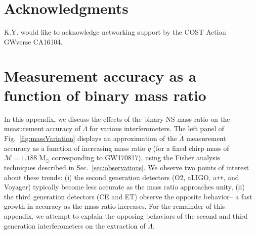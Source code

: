 \documentclass[prd,twocolumn,nofootinbib,superscriptaddress,amsmath,amssymb]{revtex4-1}
\begin{document}

\section*{Acknowledgments}\label{acknowledgments}
K.Y. would like to acknowledge networking support by the COST Action GWverse CA16104.


\appendix
\section{Measurement accuracy as a function of binary mass ratio}\label{app:measurement}
In this appendix, we discuss the effects of the binary NS mass ratio on the measurement accuracy of $\tilde\Lambda$ for various interferometers. 
The left panel of Fig.~\ref{fig:massVariation} displays an approximation of the $\tilde\Lambda$ measurement accuracy as a function of increasing mass ratio $q$ (for a fixed chirp mass of $\mathcal{M}=1.188 \text{ M}_{\odot}$ corresponding to GW170817), using the Fisher analysis techniques described in Sec.~\ref{sec:observations}.
We observe two points of interest about these trends: (i) the second generation detectors (O2, aLIGO, a\texttt{++}, and Voyager) typically become less accurate as the mass ratio approaches unity, (ii) the third generation detectors (CE and ET) observe the opposite behavior-- a fast growth in accuracy as the mass ratio increases.
For the remainder of this appendix, we attempt to explain the opposing behaviors of the second and third generation interferometers on the extraction of $\tilde\Lambda$.
\end{document}
